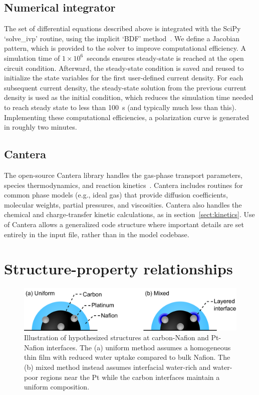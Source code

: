 \documentclass[final,3p,times,twocolumn]{elsarticle}    %
\begin{document}
\subsection{Numerical integrator}
The set of differential equations described above is integrated with the SciPy `solve\_ivp' routine, using the implicit `BDF' method~\cite{bib:scipy_2022}. We define a Jacobian pattern, which is provided to the solver to improve computational efficiency. A simulation time of $1 \times 10^6$~seconds ensures steady-state is reached at the open circuit condition. Afterward, the steady-state condition is saved and reused to initialize the state variables for the first user-defined current density. For each subsequent current density, the steady-state solution from the previous current density is used as the initial condition, which reduces the simulation time needed to reach steady state to less than 100~s (and typically much less than this). Implementing these computational efficiencies, a polarization curve is generated in roughly two minutes. 

\subsection{Cantera}
The open-source Cantera library handles the gas-phase transport parameters, species thermodynamics, and reaction kinetics~\cite{bib:cantera_2017}. Cantera includes routines for common phase models (e.g., ideal gas) that provide diffusion coefficients, molecular weights, partial pressures, and viscosities. Cantera also handles the chemical and charge-transfer kinetic calculations, as in section~\ref{sect:kinetics}. Use of Cantera allows a generalized code structure where important details are set entirely in the input file, rather than in the model codebase.


\section{Structure-property relationships}
\label{sect:struct-prop-relationships}

\begin{figure}[htb!]
    \centering
    \includegraphics[width=5.008in]{figures/Nafion-structure-5_008in.png}
    \caption{Illustration of hypothesized structures at carbon-Nafion and Pt-Nafion interfaces. The (a) uniform method assumes a homogeneous thin film with reduced water uptake compared to bulk Nafion. The (b) mixed method instead assumes interfacial water-rich and water-poor regions near the Pt while the carbon interfaces maintain a uniform composition.}
    \label{fig:struct-models}
\end{figure}
\end{document}
